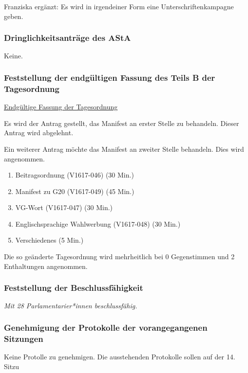 \documentclass[ngerman,headheight=70pt]{scrartcl}
\begin{document}
    Franziska ergänzt:
    Es wird in irgendeiner Form eine Unterschriftenkampagne geben.

    \subsubsection{Dringlichkeitsanträge des AStA}

    Keine.

    \newpage
    \subsubsection{Feststellung der endgültigen Fassung des Teils B der Tagesordnung}

    \underline{Endgültige Fassung der Tagesordnung}

    Es wird der Antrag gestellt, das Manifest an erster Stelle zu behandeln.
    Dieser Antrag wird abgelehnt.

    Ein weiterer Antrag möchte das Manifest an zweiter Stelle behandeln. Dies
    wird angenommen.
    \begin{enumerate}[label={\textbf{Top \theenumi}},leftmargin=*]
        \item Beitragsordnung (V1617-046) (30 Min.)
        \item Manifest zu G20 (V1617-049) (45 Min.)
        \item VG-Wort (V1617-047) (30 Min.)
        \item Englischsprachige Wahlwerbung (V1617-048) (30 Min.)
        \item Verschiedenes (5 Min.)
    \end{enumerate}

    Die so geänderte Tagesordnung wird mehrheitlich bei 0 Gegenstimmen und 2
    Enthaltungen angenommen.

    \subsubsection{Feststellung der Beschlussfähigkeit}

    \textit{Mit 28 Parlamentarier*innen beschlussfähig.}

    \subsubsection{Genehmigung der Protokolle der vorangegangenen Sitzungen}

    Keine Protolle zu genehmigen. Die ausstehenden Protokolle sollen auf der
    14. Sitzu
\end{document}
